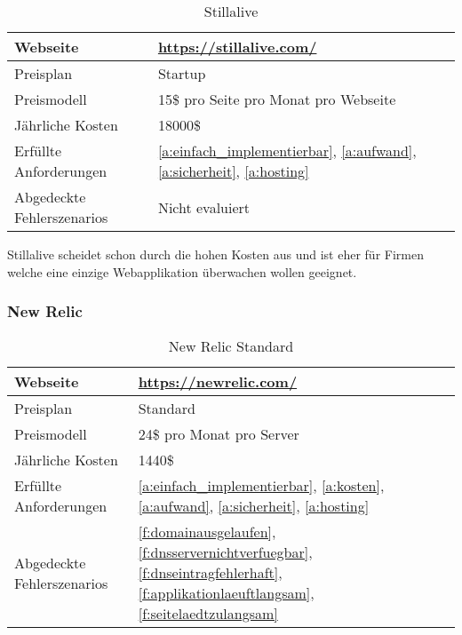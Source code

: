 \begin{table}[H]
  \centering
  \begin{tabular}{p{5cm} p{7cm}}
  \toprule
    Webseite & \url{https://stillalive.com/}\\
  \hline
    Preisplan & Startup\\
  \hline
    Preismodell & 15\$ pro Seite pro Monat pro Webseite\\
  \hline
    Jährliche Kosten & 18000\$\\
  \hline
    Erfüllte Anforderungen & \ref{a:einfach_implementierbar}, \ref{a:aufwand}, \ref{a:sicherheit}, \ref{a:hosting}\\
  \hline
    Abgedeckte Fehlerszenarios & Nicht evaluiert\\
  \bottomrule
  \end{tabular}
  \caption{Stillalive}
  \label{tab:stillalive}
\end{table}

Stillalive scheidet schon durch die hohen Kosten aus und ist eher für Firmen welche eine einzige Webapplikation überwachen wollen geeignet.

\subsubsection{New Relic}
\label{ssub:new_relic}

\begin{table}[H]
  \centering
  \begin{tabular}{p{5cm} p{7cm}}
  \toprule
    Webseite & \url{https://newrelic.com/}\\
  \hline
    Preisplan & Standard\\
  \hline
    Preismodell & 24\$ pro Monat pro Server\\
  \hline
    Jährliche Kosten & 1440\$\\
  \hline
    Erfüllte Anforderungen & \ref{a:einfach_implementierbar}, \ref{a:kosten}, \ref{a:aufwand}, \ref{a:sicherheit}, \ref{a:hosting}\\
  \hline
    Abgedeckte Fehlerszenarios & \ref{f:domainausgelaufen}, \ref{f:dnsservernichtverfuegbar}, \ref{f:dnseintragfehlerhaft}, \ref{f:applikationlaeuftlangsam}, \ref{f:seitelaedtzulangsam}\\
  \bottomrule
  \end{tabular}
  \caption{New Relic Standard}
  \label{tab:new_relic_standard}
\end{table}

